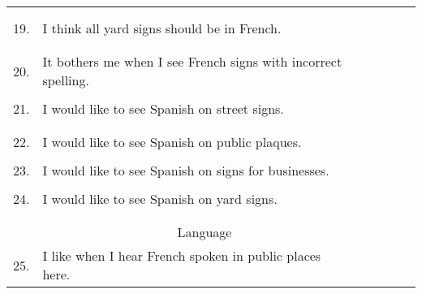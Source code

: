 \begin{longtable}[c]{| r p{} | c | c | c | c | c |}
          &                                                                           & & & & & \\
          &                                                                           & & & & & \\
      \hline
      19. & I think all yard signs should be in French.                               & & & & & \\
          &                                                                           & & & & & \\
          &                                                                           & & & & & \\
      \hline
      20. & It bothers me when I see French signs with incorrect spelling.            & & & & & \\
          &                                                                           & & & & & \\
      \hline
      21. & I would like to see Spanish on street signs.                              & & & & & \\
          &                                                                           & & & & & \\
          &                                                                           & & & & & \\
      \hline
      22. & I would like to see Spanish on public plaques.                            & & & & & \\
          &                                                                           & & & & & \\
      \hline
      23. & I would like to see Spanish on signs for businesses.                      & & & & & \\
          &                                                                           & & & & & \\
      \hline
      24. & I would like to see Spanish on yard signs.                                & & & & & \\
          &                                                                           & & & & & \\
          &                                                                           & & & & & \\
      \hline
      \multicolumn{6}{c}{Language} \\
      \hline
      25. & I like when I hear French spoken in public places here.                   & & & & & \\

\end{longtable}
